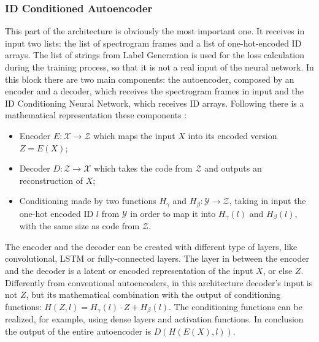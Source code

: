 \subsubsection{ID Conditioned Autoencoder}
This part of the architecture is obviously the most important one. It receives in input two lists: the list of spectrogram frames and a list of one-hot-encoded ID arrays. The list of strings from Label Generation is used for the loss calculation during the training process, so that it is not a real input of the neural network. In this block there are two main components: the autoencoder, composed by an encoder and a decoder, which receives the spectrogram frames in input and the ID Conditioning Neural Network, which receives ID arrays. Following there is a mathematical representation these components \cite{18IDConditionedAutoEncoder}:
\begin{itemize}
    \item {Encoder $E: \mathcal{X} \rightarrow \mathcal{Z}$ which maps the input $X$ into its encoded version $Z = E(X)$;}
    \item {Decoder $D:  \mathcal{Z} \rightarrow \mathcal{X}$ which takes the code from $\mathcal{Z}$ and outputs an reconstruction of $X$; }
    \item {Conditioning made by two functions $H_\gamma$ and $H_\beta: \mathcal{Y} \rightarrow \mathcal{Z}$, taking in input the one-hot encoded ID $l$ from $\mathcal{Y}$ in order to map it into $H_\gamma(l)$ and $H_\beta(l)$, with the same size as code from $\mathcal{Z}$.}
\end{itemize}
The encoder and the decoder can be created with different type of layers, like convolutional, LSTM or fully-connected layers. The layer in between the encoder and the decoder is a latent or encoded representation of the input $X$, or else $Z$. Differently from conventional autoencoders, in this architecture decoder's input is not $Z$, but its mathematical combination with the output of conditioning functions: $H(Z,l) = H_\gamma(l) \cdot Z + H_\beta(l)$. The conditioning functions can be realized, for example, using dense layers and activation functions. In conclusion the output of the entire autoencoder is $D(H(E(X),l))$.
